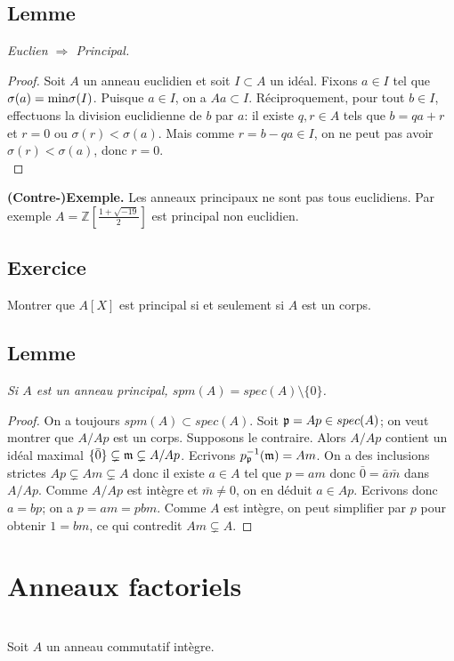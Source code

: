 \documentclass[a4paper, oneside, 12pt]{book}
\theoremstyle{definition} %
\newcommand{\Z}{\mathbb{Z}}
\begin{document}
 

\section{Lemme}\label{EuclIsPrinc} \textit{Euclien $\Rightarrow$ Principal.} 
 
 \begin{proof} Soit $A$ un anneau euclidien et soit $I\subset A$ un idéal. Fixons $a\in I$ tel que $\sigma(a)=\hbox{\rm min}\sigma(I)$. Puisque $a\in I$, on a $Aa\subset I$. Réciproquement, pour tout $b\in I$, effectuons la division euclidienne de $b$ par $a$: il existe $q,r\in A$ tels que $b=qa+r$ et $r=0$ ou $\sigma(r)<\sigma(a)$. Mais comme $r=b-qa\in I$, on ne peut pas avoir $\sigma(r)<\sigma(a)$, donc $r=0$.\\
 \end{proof}
 
 \textbf{(Contre-)Exemple.} Les anneaux principaux ne sont pas tous euclidiens. Par exemple  $A=\Z[\frac{1+\sqrt{-19}}{2}]$ est principal non euclidien.\\
 
 \section{Exercice} Montrer que $A[X]$ est principal si et seulement si $A$ est un corps. 
  \section{Lemme}\textit{Si $A$ est un anneau principal, $spm(A)=spec(A)\setminus \lbrace 0\rbrace$.}
  
  \begin{proof} On a toujours $spm(A)\subset spec(A)$. Soit $\frak{p}=Ap\in spec(A)$; on veut montrer que $A/Ap$ est un corps. Supposons le contraire. Alors $A/Ap$ contient un idéal maximal $\lbrace \bar{0}\rbrace\subsetneq\frak{m}\subsetneq A/Ap$. Ecrivons $p_{\frak{p}}^{-1}(\frak{m})=Am$. On a des inclusions strictes  $Ap\subsetneq Am\subsetneq A$ donc il existe $a\in A$ tel que $p=am$ donc $\bar{0}=\bar{a}\bar{m}$ dans $A/Ap$. Comme $A/Ap$ est intègre et $\bar{m}\not= 0$, on en déduit $a\in Ap$. Ecrivons donc $a=bp$; on a $p=am=pbm$. Comme $A$ est intègre, on peut simplifier par $p$ pour obtenir $1=bm$, ce qui contredit $ Am\subsetneq A$.   \end{proof}
 \chapter{Anneaux factoriels}\label{Factoriel} \textit{}\\
  Soit $A$ un anneau commutatif intègre. \\
 
\end{document}
